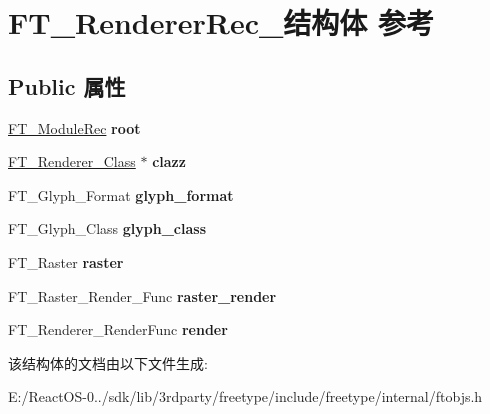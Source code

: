 \hypertarget{struct_f_t___renderer_rec__}{}\section{F\+T\+\_\+\+Renderer\+Rec\+\_\+结构体 参考}
\label{struct_f_t___renderer_rec__}
\subsection*{Public 属性}
\begin{DoxyCompactItemize}
\item 
\mbox{\label{struct_f_t___renderer_rec___a7c93326898f03a9eb224f57104fa2433}} 
\hyperlink{struct_f_t___module_rec__}{F\+T\+\_\+\+Module\+Rec} {\bfseries root}
\item 
\mbox{\label{struct_f_t___renderer_rec___a2b13c0a776ea7f589f41f576f9c4e8ad}} 
\hyperlink{struct_f_t___renderer___class__}{F\+T\+\_\+\+Renderer\+\_\+\+Class} $\ast$ {\bfseries clazz}
\item 
\mbox{\label{struct_f_t___renderer_rec___a478b14f577b633cea7043fb17d404721}} 
F\+T\+\_\+\+Glyph\+\_\+\+Format {\bfseries glyph\+\_\+format}
\item 
\mbox{\label{struct_f_t___renderer_rec___a38a591be1d20fb2b4d81e48ebb624dd7}} 
F\+T\+\_\+\+Glyph\+\_\+\+Class {\bfseries glyph\+\_\+class}
\item 
\mbox{\label{struct_f_t___renderer_rec___a9c54a2da84f5892e0563d032ebd1ee09}} 
F\+T\+\_\+\+Raster {\bfseries raster}
\item 
\mbox{\label{struct_f_t___renderer_rec___a6dc07268fc39d9dde130a5708607d19d}} 
F\+T\+\_\+\+Raster\+\_\+\+Render\+\_\+\+Func {\bfseries raster\+\_\+render}
\item 
\mbox{\label{struct_f_t___renderer_rec___a197bfeb9dde4aef8eee87bc3ea95312e}} 
F\+T\+\_\+\+Renderer\+\_\+\+Render\+Func {\bfseries render}
\end{DoxyCompactItemize}


该结构体的文档由以下文件生成\+:\begin{DoxyCompactItemize}
\item 
E\+:/\+React\+O\+S-\/0../sdk/lib/3rdparty/freetype/include/freetype/internal/ftobjs.\+h\end{DoxyCompactItemize}
